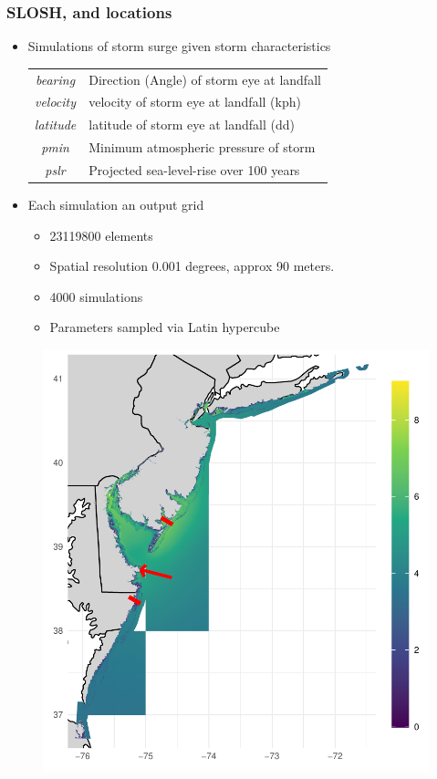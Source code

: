 \documentclass[aspectratio=169,10pt,notes]{beamer}
\begin{document}
\begin{frame}
    \frametitle{SLOSH, and locations}
    \begin{minipage}{0.54\textwidth}
    {\footnotesize
    \begin{itemize}
        \item Simulations of storm surge given storm characteristics \par
        \begin{tabular}{cl}
            \textit{bearing}  & Direction (Angle) of storm eye at landfall \\
            \textit{velocity} & velocity of storm eye at landfall (kph)    \\
            \textit{latitude} & latitude of storm eye at landfall (dd)     \\
            \textit{pmin}     & Minimum atmospheric pressure of storm      \\
            \textit{pslr}     & Projected sea-level-rise over 100 years    \\
            \end{tabular}
        \item Each simulation an output grid
        \begin{itemize}
            \item \num{23119800} elements
            \item Spatial resolution 0.001 degrees, approx 90 meters.
        \item 4000 simulations
        \item Parameters sampled via Latin hypercube
        \end{itemize}
    \end{itemize}
    }
    \end{minipage}%
    \begin{minipage}{0.45\textwidth}
    \begin{figure}
        \centering
        \includegraphics[width=\textwidth]{./ch3/plots/slosh_1run}

\end{figure}
\end{minipage}
\end{frame}
\end{document}
